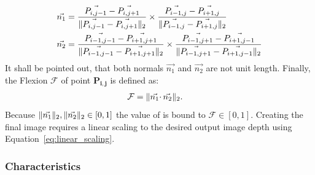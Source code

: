 \begin{equation}
\begin{aligned}
    \vec{n_1} &= \frac{\vec{P_{i,j-1}} - \vec{P_{i,j+1}}}{\lVert\vec{P_{i,j-1}} - \vec{P_{i,j+1}}\rVert_{2}}
                \times \frac{\vec{P_{i-1,j}} - \vec{P_{i+1,j}}}{\lVert\vec{P_{i-1,j}} - \vec{P_{i+1,j}}\rVert_{2}} \\
    \vec{n_2} &= \frac{\vec{P_{i-1,j-1}} - \vec{P_{i+1,j+1}}}{\lVert\vec{P_{i-1,j-1}} - \vec{P_{i+1,j+1}}\rVert_{2}}
                \times \frac{\vec{P_{i-1,j+1}} - \vec{P_{i+1,j-1}}}{\lVert\vec{P_{i-1,j+1}} - \vec{P_{i+1,j-1}}\rVert_{2}}
    \label{eq:flexion_normals}
\end{aligned}
\end{equation}
It shall be pointed out, that both normals $\vec{n_1}$ and $\vec{n_2}$ are not unit length.
Finally, the Flexion $\mathcal{F}$ of point $\mathbf{P_{i,j}}$ is defined as:
\begin{align}
    \mathcal{F} &= \lVert\vec{n_1} \cdotp \vec{n_2}\rVert_{2}\text{.}
\end{align}
Because $\lVert\vec{n_1}\rVert_{2},\lVert\vec{n_2}\rVert_{2} \in [0,1]$ the value of is bound to $\mathcal{F} \in [0, 1]$.
Creating the final image requires a linear scaling to the desired output image depth using Equation~\ref{eq:linear_scaling}.

\subsubsection*{Characteristics}

